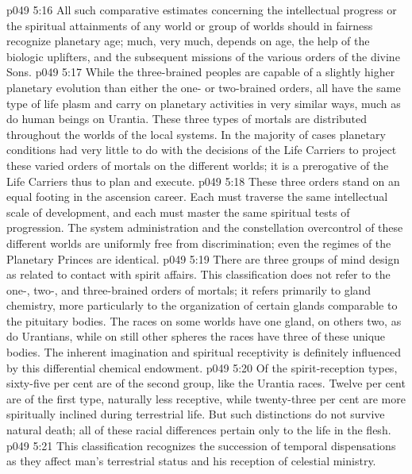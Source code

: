 \vs p049 5:16 All such comparative estimates concerning the intellectual progress or the spiritual attainments of any world or group of worlds should in fairness recognize planetary age; much, very much, depends on age, the help of the biologic uplifters, and the subsequent missions of the various orders of the divine Sons.
\vs p049 5:17 While the three\hyp{}brained peoples are capable of a slightly higher planetary evolution than either the one\hyp{} or two\hyp{}brained orders, all have the same type of life plasm and carry on planetary activities in very similar ways, much as do human beings on Urantia. These three types of mortals are distributed throughout the worlds of the local systems. In the majority of cases planetary conditions had very little to do with the decisions of the Life Carriers to project these varied orders of mortals on the different worlds; it is a prerogative of the Life Carriers thus to plan and execute.
\vs p049 5:18 These three orders stand on an equal footing in the ascension career. Each must traverse the same intellectual scale of development, and each must master the same spiritual tests of progression. The system administration and the constellation overcontrol of these different worlds are uniformly free from discrimination; even the regimes of the Planetary Princes are identical.
\pc \vs p049 5:19 \bibnobreakspace {} There are three groups of mind design as related to contact with spirit affairs. This classification does not refer to the one-, two-, and three\hyp{}brained orders of mortals; it refers primarily to gland chemistry, more particularly to the organization of certain glands comparable to the pituitary bodies. The races on some worlds have one gland, on others two, as do Urantians, while on still other spheres the races have three of these unique bodies. The inherent imagination and spiritual receptivity is definitely influenced by this differential chemical endowment.
\vs p049 5:20 Of the spirit\hyp{}reception types, sixty\hyp{}five per cent are of the second group, like the Urantia races. Twelve per cent are of the first type, naturally less receptive, while twenty\hyp{}three per cent are more spiritually inclined during terrestrial life. But such distinctions do not survive natural death; all of these racial differences pertain only to the life in the flesh.
\pc \vs p049 5:21 \bibnobreakspace {} This classification recognizes the succession of temporal dispensations as they affect man’s terrestrial status and his reception of celestial ministry.
